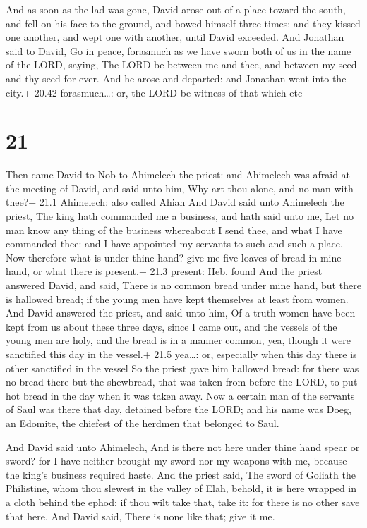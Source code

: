  And as soon as the lad was gone, David arose out of a
place toward the south, and fell on his face to the ground, and bowed
himself three times: and they kissed one another, and wept one with
another, until David exceeded.  And Jonathan said to David,
Go in peace, forasmuch as we have sworn both of us in the name of the
LORD, saying, The LORD be between me and thee, and between my seed and
thy seed for ever. And he arose and departed: and Jonathan went into the
city.+ 20.42 forasmuch\ldots: or, the LORD be witness of that which etc

\hypertarget{section-20}{%
\section{21}\label{section-20}}

 Then came David to Nob to Ahimelech the priest: and
Ahimelech was afraid at the meeting of David, and said unto him, Why art
thou alone, and no man with thee?+ 21.1 Ahimelech: also called Ahiah
 And David said unto Ahimelech the priest, The king hath
commanded me a business, and hath said unto me, Let no man know any
thing of the business whereabout I send thee, and what I have commanded
thee: and I have appointed my servants to such and such a place.
 Now therefore what is under thine hand? give me five loaves
of bread in mine hand, or what there is present.+ 21.3 present: Heb.
found  And the priest answered David, and said, There is no
common bread under mine hand, but there is hallowed bread; if the young
men have kept themselves at least from women.  And David
answered the priest, and said unto him, Of a truth women have been kept
from us about these three days, since I came out, and the vessels of the
young men are holy, and the bread is in a manner common, yea, though it
were sanctified this day in the vessel.+ 21.5 yea\ldots: or, especially
when this day there is other sanctified in the vessel  So
the priest gave him hallowed bread: for there was no bread there but the
shewbread, that was taken from before the LORD, to put hot bread in the
day when it was taken away.  Now a certain man of the
servants of Saul was there that day, detained before the LORD; and his
name was Doeg, an Edomite, the chiefest of the herdmen that belonged to
Saul.

 And David said unto Ahimelech, And is there not here
under thine hand spear or sword? for I have neither brought my sword nor
my weapons with me, because the king's business required haste.
 And the priest said, The sword of Goliath the Philistine,
whom thou slewest in the valley of Elah, behold, it is here wrapped in a
cloth behind the ephod: if thou wilt take that, take it: for there is no
other save that here. And David said, There is none like that; give it
me.

